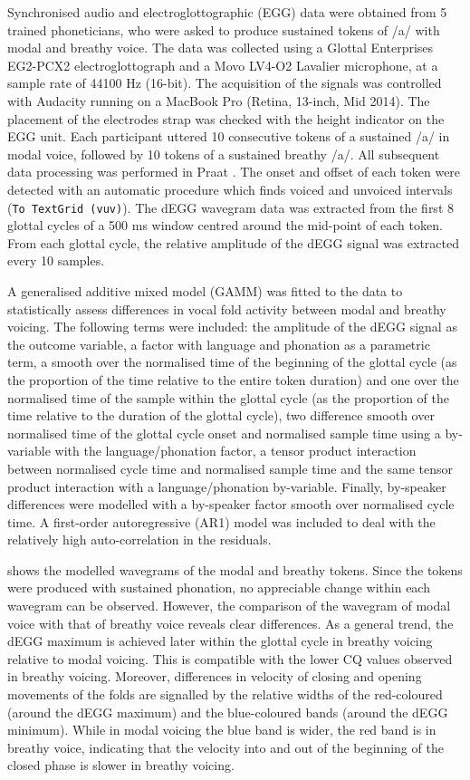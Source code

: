\documentclass[12pt,a4paper,]{article}
\begin{document}
Synchronised audio and electroglottographic (EGG) data were obtained
from 5 trained phoneticians, who were asked to produce sustained tokens
of /a/ with modal and breathy voice. The data was collected using a
Glottal Enterprises EG2-PCX2 electroglottograph and a Movo LV4-O2
Lavalier microphone, at a sample rate of 44100 Hz (16-bit). The
acquisition of the signals was controlled with Audacity running on a
MacBook Pro (Retina, 13-inch, Mid 2014). The placement of the electrodes
strap was checked with the height indicator on the EGG unit. Each
participant uttered 10 consecutive tokens of a sustained /a/ in modal
voice, followed by 10 tokens of a sustained breathy /a/. All subsequent
data processing was performed in Praat \citep{boersma2018}. The onset
and offset of each token were detected with an automatic procedure which
finds voiced and unvoiced intervals (\texttt{To\ TextGrid\ (vuv)}). The
dEGG wavegram data was extracted from the first 8 glottal cycles of a
500 ms window centred around the mid-point of each token. From each
glottal cycle, the relative amplitude of the dEGG signal was extracted
every 10 samples.

A generalised additive mixed model (GAMM) was fitted to the data to
statistically assess differences in vocal fold activity between modal
and breathy voicing. The following terms were included: the amplitude of
the dEGG signal as the outcome variable, a factor with language and
phonation as a parametric term, a smooth over the normalised time of the
beginning of the glottal cycle (as the proportion of the time relative
to the entire token duration) and one over the normalised time of the
sample within the glottal cycle (as the proportion of the time relative
to the duration of the glottal cycle), two difference smooth over
normalised time of the glottal cycle onset and normalised sample time
using a by-variable with the language/phonation factor, a tensor product
interaction between normalised cycle time and normalised sample time and
the same tensor product interaction with a language/phonation
by-variable. Finally, by-speaker differences were modelled with a
by-speaker factor smooth over normalised cycle time. A first-order
autoregressive (AR1) model was included to deal with the relatively high
auto-correlation in the residuals.

 shows the modelled wavegrams of the modal and breathy
tokens. Since the tokens were produced with sustained phonation, no
appreciable change within each wavegram can be observed. However, the
comparison of the wavegram of modal voice with that of breathy voice
reveals clear differences. As a general trend, the dEGG maximum is
achieved later within the glottal cycle in breathy voicing relative to
modal voicing. This is compatible with the lower CQ values observed in
breathy voicing. Moreover, differences in velocity of closing and
opening movements of the folds are signalled by the relative widths of
the red-coloured (around the dEGG maximum) and the blue-coloured bands
(around the dEGG minimum). While in modal voicing the blue band is
wider, the red band is in breathy voice, indicating that the velocity
into and out of the beginning of the closed phase is slower in breathy
voicing.
\end{document}
